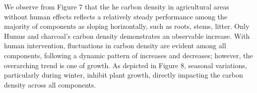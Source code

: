 \documentclass[a4paper]{article}
\begin{document}
We observe from Figure 7 that the he carbon density in agricultural areas without human effects reflects a relatively steady performance among the majority of components as sloping horizontally, such as roots, stems, litter. Only Humus and charcoal’s carbon density demonstrates an observable increase. With human intervention, fluctuations in carbon density are evident among all components, following a dynamic pattern of increases and decreases; however, the overarching trend is one of growth. As depicted in Figure 8, seasonal variations, particularly during winter, inhibit plant growth, directly impacting the carbon density across all components. 



\end{document}

